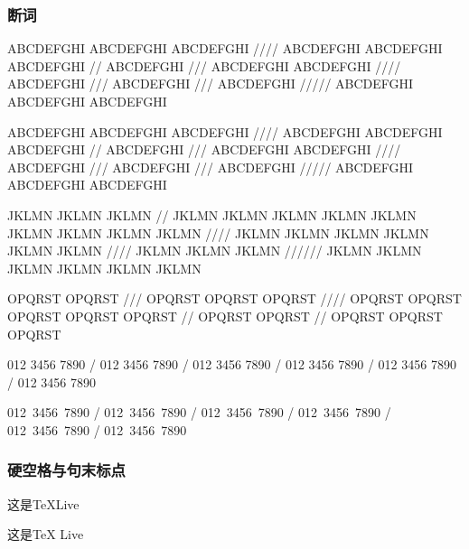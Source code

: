 \documentclass[twoside]{ctexart}
\begin{document}
        \subsubsection{断词}
            ABCDEFGHI ABCDEFGHI ABCDEFGHI //// ABCDEFGHI ABCDEFGHI ABCDEFGHI // ABCDEFGHI /// ABCDEFGHI ABCDEFGHI //// ABCDEFGHI /// ABCDEFGHI /// ABCDEFGHI ///// ABCDEFGHI ABCDEFGHI ABCDEFGHI

            ABCDEFGHI ABCDEFGHI ABCDEFGHI //// ABCDEFGHI ABCDEFGHI ABCDEFGHI // ABCDEFGHI /// ABCDEFGHI ABCDEFGHI //// ABCDEFGHI /// ABCDEFGHI /// ABCDEFGHI ///// ABCDEFGHI ABCDEFGHI ABCDEFGHI

            JKLMN JKLMN JKLMN // JKLMN JKLMN JKLMN JKLMN JKLMN JKLMN JKLMN JKLMN JKLMN //// JKLMN JKLMN JKLMN JKLMN JKLMN JKLMN //// JKLMN JKLMN JKLMN ////// JKLMN JKLMN JKLMN JKLMN JKLMN JKLMN

            OP\-QRS\-T OP\-QRS\-T /// OP\-QRS\-T OP\-QRS\-T OP\-QRS\-T //// OP\-QRS\-T OP\-QRS\-T OP\-QRS\-T OP\-QRS\-T OP\-QRS\-T // OP\-QRS\-T OP\-QRS\-T // OP\-QRS\-T OP\-QRS\-T OP\-QRS\-T 
         
            012 3456 7890 / 012 3456 7890 / 012 3456 7890 / 012 3456 7890 / 012 3456 7890 / 012 3456 7890

            \mbox{012 3456 7890} / \mbox{012 3456 7890} / \mbox{012 3456 7890} / \mbox{012 3456 7890} / \mbox{012 3456 7890} / \mbox{012 3456 7890}

        \subsubsection{硬空格与句末标点}
            这是\TeX Live %

            这是\TeX{} Live %
\end{document}
